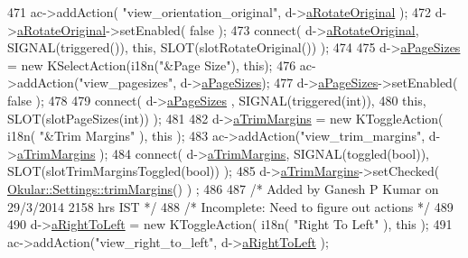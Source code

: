 \begin{DoxyCode}
471     ac->addAction( \textcolor{stringliteral}{"view\_orientation\_original"}, d->\hyperlink{classPageViewPrivate_ae57bd1f37889d8a28535e877c2fa87ed}{aRotateOriginal} );
472     d->\hyperlink{classPageViewPrivate_ae57bd1f37889d8a28535e877c2fa87ed}{aRotateOriginal}->setEnabled( \textcolor{keyword}{false} );
473     connect( d->\hyperlink{classPageViewPrivate_ae57bd1f37889d8a28535e877c2fa87ed}{aRotateOriginal}, SIGNAL(triggered()), \textcolor{keyword}{this}, SLOT(slotRotateOriginal()) );
474 
475     d->\hyperlink{classPageViewPrivate_a5f864847956ada5d8933fe2d28bbc075}{aPageSizes} = \textcolor{keyword}{new} KSelectAction(i18n(\textcolor{stringliteral}{"&Page Size"}), \textcolor{keyword}{this});
476     ac->addAction(\textcolor{stringliteral}{"view\_pagesizes"}, d->\hyperlink{classPageViewPrivate_a5f864847956ada5d8933fe2d28bbc075}{aPageSizes});
477     d->\hyperlink{classPageViewPrivate_a5f864847956ada5d8933fe2d28bbc075}{aPageSizes}->setEnabled( \textcolor{keyword}{false} );
478 
479     connect( d->\hyperlink{classPageViewPrivate_a5f864847956ada5d8933fe2d28bbc075}{aPageSizes} , SIGNAL(triggered(\textcolor{keywordtype}{int})),
480          \textcolor{keyword}{this}, SLOT(slotPageSizes(\textcolor{keywordtype}{int})) );
481 
482     d->\hyperlink{classPageViewPrivate_a0ef5e6fe307660bd3fbe6bd999b895a7}{aTrimMargins}  = \textcolor{keyword}{new} KToggleAction( i18n( \textcolor{stringliteral}{"&Trim Margins"} ), \textcolor{keyword}{this} );
483     ac->addAction(\textcolor{stringliteral}{"view\_trim\_margins"}, d->\hyperlink{classPageViewPrivate_a0ef5e6fe307660bd3fbe6bd999b895a7}{aTrimMargins} );
484     connect( d->\hyperlink{classPageViewPrivate_a0ef5e6fe307660bd3fbe6bd999b895a7}{aTrimMargins}, SIGNAL(toggled(\textcolor{keywordtype}{bool})), SLOT(slotTrimMarginsToggled(\textcolor{keywordtype}{bool})) );
485     d->\hyperlink{classPageViewPrivate_a0ef5e6fe307660bd3fbe6bd999b895a7}{aTrimMargins}->setChecked( \hyperlink{classOkular_1_1Settings_aaafcee0b6362edd2811f3ca8d575493d}{Okular::Settings::trimMargins}() )
      ;
486 
487     \textcolor{comment}{/* Added by Ganesh P Kumar on 29/3/2014 2158 hrs IST */}
488     \textcolor{comment}{/* Incomplete: Need to figure out actions            */}
489 
490     d->\hyperlink{classPageViewPrivate_a4f801cbeb2d2c5bb5cccd84f373aeec9}{aRightToLeft}  = \textcolor{keyword}{new} KToggleAction( i18n( \textcolor{stringliteral}{"Right To Left"} ), \textcolor{keyword}{this} );
491     ac->addAction(\textcolor{stringliteral}{"view\_right\_to\_left"}, d->\hyperlink{classPageViewPrivate_a4f801cbeb2d2c5bb5cccd84f373aeec9}{aRightToLeft} );

\end{DoxyCode}
